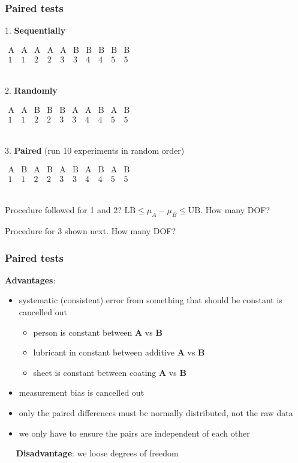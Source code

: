 \begin{frame}\frametitle{Paired tests}

	1. \textbf{Sequentially}

	$
	\begin{array}{cccccccccc}
		\text{A} & \text{A} & \text{A} & \text{A} & \text{A} & \text{B} & \text{B} & \text{B} & \text{B} & \text{B} \\
		1 & 1 & 2 & 2 & 3 & 3 & 4 & 4 & 5 & 5\\
	\end{array}
	$

	$\qquad$

	2. \textbf{Randomly}

	$
	\begin{array}{cccccccccc}
		\text{A} & \text{A} & \text{B} & \text{B} & \text{B} & \text{A} & \text{A} & \text{B} & \text{A} & \text{B} \\
		1 & 1 & 2 & 2 & 3 & 3 & 4 & 4 & 5 & 5\\
	\end{array}
	$

	$\qquad$

	3. \textbf{Paired} (run 10 experiments in random order)

	$
	\begin{array}{cccccccccc}
		\text{A} & \text{B} & \text{A} & \text{B} & \text{A} & \text{B} & \text{A} & \text{B} & \text{A} & \text{B} \\
		1 & 1 & 2 & 2 & 3 & 3 & 4 & 4 & 5 & 5\\
	\end{array}
	$

	$\qquad$

	Procedure followed for 1 and 2? $\text{LB} \leq \mu_A - \mu_B \leq \text{UB}$. How many DOF?

	Procedure for 3 shown next. How many DOF?
\end{frame}

\begin{frame}\frametitle{Paired tests}

	\textbf{Advantages}:
	\begin{itemize}
		\item systematic (consistent) error from something that should be constant is cancelled out
		\begin{itemize}
			\item person is constant between \textbf{A} vs \textbf{B}
			\item lubricant in constant between additive \textbf{A} vs \textbf{B}
			\item sheet is constant between coating \textbf{A} vs \textbf{B}
		\end{itemize}
		\item measurement bias is cancelled out
		\item only the paired differences must be normally distributed, not the raw data
		\item we only have to ensure the pairs are independent of each other
	\end{itemize}

	$\quad$ \textbf{Disadvantage}: we loose degrees of freedom
\end{frame}

